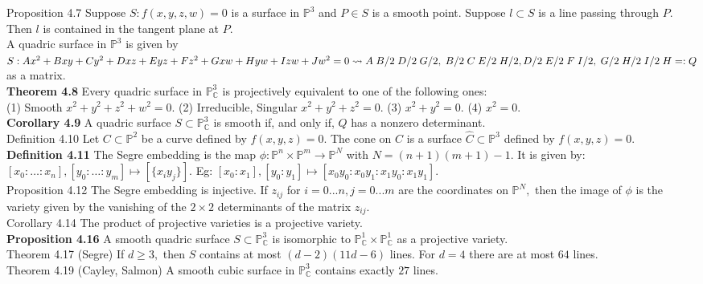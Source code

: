 \documentclass[8pt]{extarticle}
\begin{document}
Proposition 4.7 Suppose $S: f(x,y,z,w) = 0$ is a surface in $\mathbb{P}^3$ and $P \in S$ is a smooth point. Suppose $l \subset S$ is a line passing through $P.$ Then $l$ is contained in the tangent plane at $P.$\\
A quadric surface in $\mathbb{P}^3$ is given by $S:Ax^2 + Bxy + Cy^2 + Dxz + Eyz + F z^2 + Gxw + Hyw + Izw + Jw^2 = 0 \rightsquigarrow 
    A \; B/2 \; D/2 \; G/2, \; 
    B/2 \; C \; E/2 \; H/2, \\
    D/2 \; E/2 \; F \; I/2,\;  
    G/2 \; H/2 \; I/2 \; H  =: Q$ as a matrix. \\
\textbf{Theorem 4.8} Every quadric surface in $\mathbb{P}^3_\mathbb{C}$ is projectively equivalent to one of the following ones:\\
(1) Smooth $x^2 + y^2 + z^2 + w^2 = 0.$ (2) Irreducible, Singular $x^2 + y^2 + z^2 = 0.$ (3) $x^2 + y^2 = 0.$ (4) $x^2 = 0.$\\
\textbf{Corollary 4.9} A quadric surface $S \subset \mathbb{P}^3_\mathbb{C}$ is smooth if, and only if, $Q$ has a nonzero determinant.\\
Definition 4.10 Let $C\subset\mathbb{P}^2$ be a curve defined by $f(x,y,z)=0.$ The cone on $C$ is a surface $\widehat{C}\subset\mathbb{P}^3$ defined by $f(x,y,z)=0.$\\
\textbf{Definition 4.11} The Segre embedding is the map $\phi: \mathbb{P}^n \times \mathbb{P}^m\rightarrow \mathbb{P}^N$ with $N = (n + 1)(m + 1) - 1$. It is given by:\\
$[x_0: \dots : x_n], [y_0: \dots : y_m] \mapsto [\{x_i y_j\}]$. Eg: $[x_0:x_1], [y_0:y_1] \mapsto [x_0 y_0: x_0 y_1: x_1 y_0: x_1 y_1]$.\\ 
Proposition 4.12 The Segre embedding is injective. If $z_{ij}$ for $i = 0...n, j = 0...m$ are the coordinates on $\mathbb{P}^N,$ then the image of $\phi$ is the variety given by the vanishing of the $2 \times 2$ determinants of the matrix $z_{ij}.$\\
Corollary 4.14 The product of projective varieties is a projective variety.\\
\textbf{Proposition 4.16} A smooth quadric surface $S \subset \mathbb{P}^3_\mathbb{C}$ is isomorphic to $\mathbb{P}^1_\mathbb{C} \times \mathbb{P}^1_\mathbb{C}$ as a projective variety.\\
Theorem 4.17 (Segre) If $d \ge 3,$ then $S$ contains at most $(d-2)(11d-6)$ lines. For $d = 4$ there are at most $64$ lines.\\
Theorem 4.19 (Cayley, Salmon) A smooth cubic surface in $\mathbb{P}^3_\mathbb{C}$ contains exactly $27$ lines.\\
\end{document}
